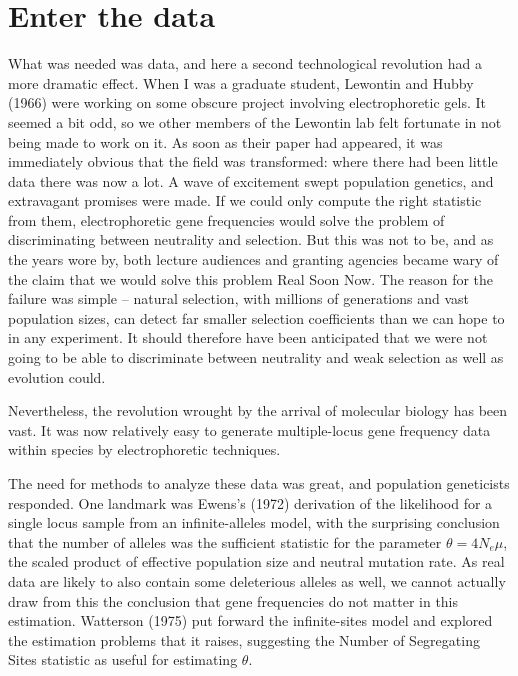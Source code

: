 \documentclass[12pt]{article}
\begin{document}
\section*{Enter the data}

What was needed was data, and here a second technological revolution
had a more dramatic effect.  When I was a graduate student,
Lewontin and Hubby (1966) were working on some obscure project involving
electrophoretic gels.  It seemed a bit odd, so we other members of
the Lewontin lab felt fortunate in not being made to work on it.  As soon
as their paper had appeared, it was immediately obvious that the field
was transformed: where there had been little data there was now a lot.
A wave of excitement swept population genetics, and
extravagant promises were made. If we could only compute
the right statistic from them, electrophoretic gene frequencies would solve
the problem of discriminating between neutrality and selection.  But this was
not to be, and as the
years wore by, both lecture audiences and granting agencies became wary of the
claim that we would solve this problem Real Soon Now.  
The reason for the failure was simple -- natural selection, with
millions of generations and vast population sizes, can detect far smaller
selection coefficients than we can hope to in any experiment.  It should
therefore have been anticipated that we were not going to be able to
discriminate between neutrality and weak selection as well as evolution could.

Nevertheless, the revolution wrought by the arrival of molecular biology
has been vast.  It was now relatively easy to generate multiple-locus
gene frequency data within species by electrophoretic techniques.

The need for methods to analyze these data was great, and population
geneticists responded.  One landmark was Ewens's (1972) derivation
of the likelihood for a single locus sample from an infinite-alleles model,
with the surprising conclusion that the number of alleles was the sufficient
statistic for the parameter $\theta = 4N_e\mu$, the scaled product of effective
population size and neutral mutation rate.  As real data are likely to
also contain some deleterious alleles as well, we cannot actually draw from
this the conclusion that gene frequencies do not matter in this estimation.
Watterson (1975) put forward the infinite-sites model and explored the
estimation problems that it raises, suggesting the Number of Segregating
Sites statistic as useful for estimating $\theta$.
\end{document}

